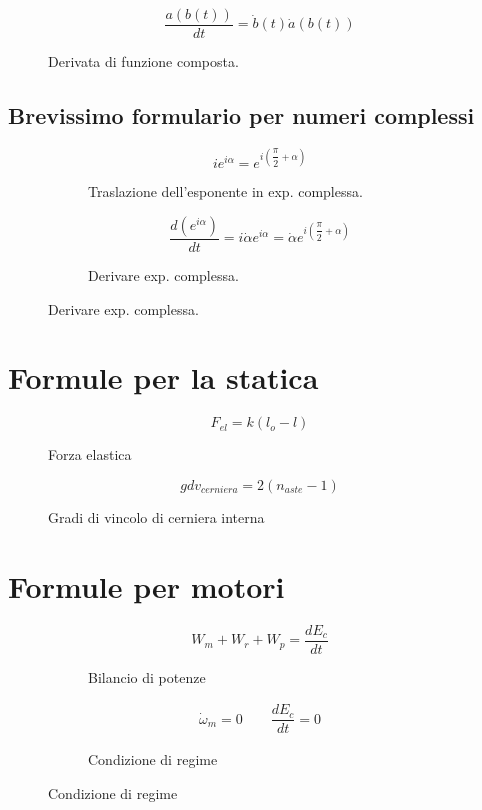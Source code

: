 \documentclass[main.tex]{subfiles}
\begin{document}
\begin{figure}[H]
  \centering
\[
	\dfrac{a(b(t))}{dt} = \dot{b}(t)\dot{a}(b(t))
\]
  \caption{Derivata di funzione composta.}
\end{figure}

\subsection{Brevissimo formulario per numeri complessi}
\begin{figure}[H]
  \begin{subfigure}[b]{.5\textwidth}
  \centering
\[
	ie^{i\alpha} = e^{i\left (\dfrac{\pi}{2} + \alpha \right )}
\]
  \caption{Traslazione dell'esponente in exp. complessa.}
  \end{subfigure}
  \hfill
  \begin{subfigure}[b]{.5\textwidth}
  \centering
\[
	\dfrac{d(e^{i\alpha})}{dt} = i\dot{\alpha}e^{i\alpha} = \dot{\alpha}e^{i\left (\dfrac{\pi}{2} + \alpha \right )}
\]
  \caption{Derivare exp. complessa.}
  \end{subfigure}
\end{figure}
\section{Formule per la statica}
\begin{figure}[H]
  \centering
\[
	F_{el} = k(l_o - l)
\]
  \caption{Forza elastica}
\end{figure}

\begin{figure}[H]
  \centering
\[
	gdv_{cerniera} = 2(n_{aste} - 1)
\]
  \caption{Gradi di vincolo di cerniera interna}
\end{figure}


\section{Formule per motori}
\begin{figure}[H]
  \begin{subfigure}[b]{.5\textwidth}
  \centering
\[
	W_m + W_r + W_p = \dfrac{dE_c}{dt}
\]
  \caption{Bilancio di potenze}
  \end{subfigure}
  \hfill
  \begin{subfigure}[b]{.5\textwidth}
  \centering
\begin{align*}
	\dot{\omega}_m = 0 \qquad \dfrac{dE_c}{dt} = 0
\end{align*}
  \caption{Condizione di regime}
  \end{subfigure}
\end{figure}
\end{document}
